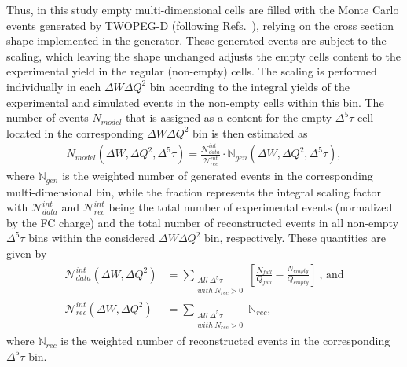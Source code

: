 Thus, in this study empty multi-dimensional cells are filled with the Monte Carlo events generated by TWOPEG-D (following Refs.~\cite{Rip_an_note:2002,Ripani:2002ss,Fed_an_note:2007,Fedotov:2008aa,Isupov:2017lnd,Arjun}), relying on the cross section shape implemented in the generator. These generated events are subject to the scaling, which leaving the shape unchanged adjusts the empty cells content to the experimental yield in the regular (non-empty) cells. The scaling is performed individually in each $\Delta W\Delta Q^2$ bin according to the integral yields of the experimental and simulated events in the non-empty cells within this bin. The number of events $N_{model}$ that is assigned as a content for the empty $\Delta^{5}\tau$ cell located in the corresponding $\Delta W\Delta Q^2$ bin is then estimated as
\begin{equation}
\begin{aligned}
N_{model}(\Delta W,\Delta Q^2,\Delta^{5}\tau) = \frac{\mathcal{N}_{data}^{int}}{\mathcal{N}_{rec}^{int}} \! \cdot \!\mathbb{N}_{gen}(\Delta W,\Delta Q^2,\Delta^{5}\tau),
\end{aligned}\label{n_model}
\end{equation}
where $\mathbb{N}_{gen}$ is the weighted number of generated events in the corresponding multi-dimensional bin, while the fraction represents the integral scaling factor with $\mathcal{N}_{data}^{int}$ and $\mathcal{N}_{rec}^{int}$ being the total number of experimental events (normalized by the FC charge) and the total number of reconstructed events in all non-empty $\Delta^{5}\tau$ bins within the considered $\Delta W\Delta Q^2$ bin, respectively. These quantities are given by
\begin{equation}
\begin{aligned}
\mathcal{N}_{data}^{int}(\Delta W,\Delta Q^2) &= \sum_{\substack{All~\Delta^{5}\tau\\ with~N_{rec}>0}} \!\!\! \left [\frac{N_{full}}{Q_{full}}-\frac{N_{empty}}{Q_{empty}} \right ]~\textrm{,~and}\\[8pt]
\mathcal{N}_{rec}^{int}(\Delta W,\Delta Q^2)  &= \sum_{\substack{All~\Delta^{5}\tau\\ with~N_{rec}>0}} \!\!\!\!\!\! \mathbb{N}_{rec},
\end{aligned}\label{ints}
\end{equation}
where  $\mathbb{N}_{rec}$ is the weighted number of reconstructed events in the corresponding $\Delta^{5}\tau$ bin. 



